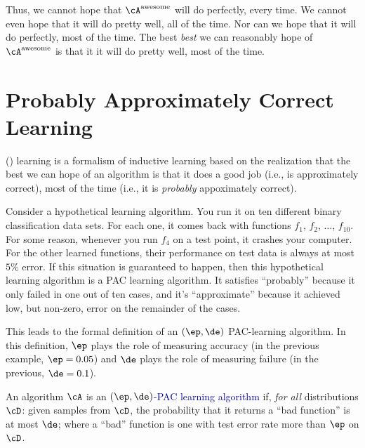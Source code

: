Thus, we cannot hope that $\cA^{\text{awesome}}$ will do perfectly,
every time.  We cannot even hope that it will do pretty well, all of
the time.  Nor can we hope that it will do perfectly, most of the
time.  The best \emph{best} we can reasonably hope of
$\cA^{\text{awesome}}$ is that it it will do pretty well, most of the
time.

\section{Probably Approximately Correct Learning}

 () learning is a
formalism of inductive learning based on the realization that the best
we can hope of an algorithm is that it does a good job (i.e., is
approximately correct), most of the time (i.e., it is \emph{probably}
appoximately correct).

Consider a hypothetical learning algorithm.  You run it on ten
different binary classification data sets.  For each one, it comes
back with functions $f_1$, $f_2$, $\dots$, $f_{10}$.  For some reason,
whenever you run $f_4$ on a test point, it crashes your computer.  For
the other learned functions, their performance on test data is always
at most $5\%$ error.  If this situation is guaranteed to happen, then
this hypothetical learning algorithm is a PAC learning algorithm.  It
satisfies ``probably'' because it only failed in one out of ten cases,
and it's ``approximate'' because it achieved low, but non-zero, error
on the remainder of the cases.

This leads to the formal definition of an $(\ep,\de)$ PAC-learning
algorithm.  In this definition, $\ep$ plays the role of measuring
accuracy (in the previous example, $\ep = 0.05$) and $\de$ plays the
role of measuring failure (in the previous, $\de = 0.1$).

\begin{definition}
  An algorithm $\cA$ is an \textcolor{darkblue}{$(\ep,\de)$-PAC
    learning algorithm} if, \emph{for all} distributions $\cD$: given
  samples from $\cD$, the probability that it returns a ``bad
  function'' is at most $\de$; where a ``bad'' function is one with
  test error rate more than $\ep$ on $\cD$.
\end{definition}

